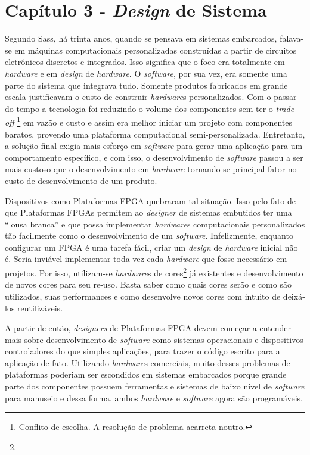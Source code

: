 \part{Capítulo 3 - \textit{Design} de Sistema}

Segundo Sass, há trinta anos, quando se pensava em sistemas embarcados, falava-se em máquinas computacionais personalizadas construídas a partir de circuitos eletrônicos discretos e integrados. Isso significa que o foco era totalmente em \textit{hardware} e em \textit{design} de \textit{hardware}. O \textit{software}, por sua vez, era somente uma parte do sistema que integrava tudo. Somente produtos fabricados em grande escala justificavam o custo de construir \textit{hardware}s personalizados. Com o passar do tempo a tecnologia foi reduzindo o volume dos componentes sem ter o \textit{trade-off} \footnote{Conflito de escolha. A resolução de problema acarreta noutro.} em vazão e custo e assim era melhor iniciar um projeto com componentes baratos, provendo uma plataforma computacional semi-personalizada. Entretanto, a solução final exigia mais esforço em \textit{software} para gerar uma aplicação para um comportamento específico, e com isso, o desenvolvimento de \textit{software} passou a ser mais custoso que o desenvolvimento em \textit{hardware} tornando-se principal fator no custo de desenvolvimento de um produto.

Dispositivos como Plataformas FPGA quebraram tal situação. Isso pelo fato de que Plataformas FPGAs permitem ao \textit{\textit{design}er} de sistemas embutidos ter uma “lousa branca” e que possa implementar \textit{hardware}s computacionais personalizados tão facilmente como o desenvolvimento de um \textit{software}. Infelizmente, enquanto configurar um FPGA é uma tarefa fácil, criar um \textit{design} de \textit{hardware} inicial não é. Seria inviável implementar toda vez cada \textit{hardware} que fosse necessário em projetos. Por isso, utilizam-se \textit{hardware}s de cores\footnote{} já existentes e desenvolvimento de novos cores para seu re-uso. Basta saber como quais cores serão e como são utilizados, suas performances e como desenvolve novos cores com intuito de deixá-los reutilizáveis.

A partir de então, \textit{\textit{\textit{design}er}s} de Plataformas FPGA devem começar a entender mais sobre desenvolvimento de \textit{software} como sistemas operacionais e dispositivos controladores do que simples aplicações, para trazer o código escrito para a aplicação de fato. Utilizando \textit{hardware}s comerciais, muito desses problemas de plataformas poderiam ser escondidos em sistemas embarcados porque grande parte dos componentes possuem ferramentas e sistemas de baixo nível de \textit{software} para manuseio e dessa forma, ambos \textit{hardware} e \textit{software} agora são programáveis.





